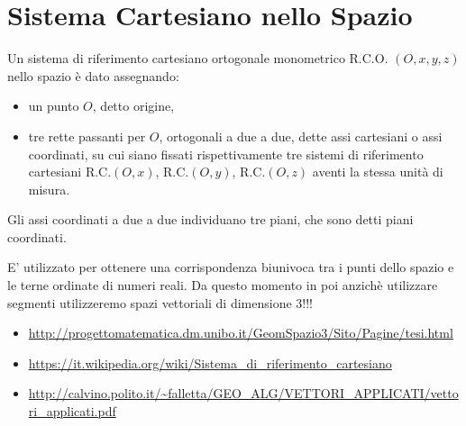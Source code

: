 \section{Sistema Cartesiano nello Spazio}
\begin{definizione}
Un sistema di riferimento cartesiano ortogonale monometrico R.C.O. $(O,x,y,z)$ nello spazio è dato assegnando:
\begin{itemize}
 \item un punto $O$, detto origine,
 \item tre rette passanti per $O$, ortogonali a due a due, dette assi cartesiani o assi coordinati, su cui siano fissati rispettivamente tre sistemi di riferimento cartesiani R.C.$(O,x)$, R.C.$(O,y)$, R.C.$(O,z)$ aventi la stessa unità di misura.
\end{itemize}
Gli assi coordinati a due a due individuano tre piani, che sono detti piani coordinati.
\end{definizione}

\begin{osservazione}
E' utilizzato per ottenere una corrispondenza biunivoca tra i punti dello spazio e le terne ordinate di numeri reali. Da questo momento in poi anzichè utilizzare segmenti utilizzeremo spazi vettoriali di dimensione 3!!!
\end{osservazione}

\begin{osservazione}
\begin{itemize}
 \item \url{http://progettomatematica.dm.unibo.it/GeomSpazio3/Sito/Pagine/tesi.html}
 \item \url{https://it.wikipedia.org/wiki/Sistema_di_riferimento_cartesiano}
 \item \url{http://calvino.polito.it/~falletta/GEO_ALG/VETTORI_APPLICATI/vettori_applicati.pdf}
\end{itemize}
\end{osservazione}
